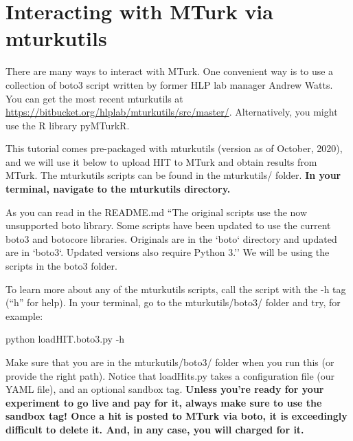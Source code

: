 \documentclass{article}
\newenvironment{code}%
   {\par\noindent\adjustbox{margin=1ex,bgcolor=shadecolor,margin=0ex \medskipamount}\bgroup\minipage\linewidth\verbatim}%
   {\endverbatim\endminipage\egroup}
\begin{document}
\section{Interacting with MTurk via mturkutils}

There are many ways to interact with MTurk. One convenient way is to use a collection of boto3 script written by former HLP lab manager Andrew Watts. You can get the most recent mturkutils at \url{https://bitbucket.org/hlplab/mturkutils/src/master/}. Alternatively, you might use the R library pyMTurkR. 

This tutorial comes pre-packaged with mturkutils (version as of October, 2020), and we will use it below to upload HIT to MTurk and obtain results from MTurk. The mturkutils scripts can be found in the mturkutils/ folder. \textbf{In your terminal, navigate to the mturkutils directory.} 

As you can read in the README.md ``The original scripts use the now unsupported boto library. Some scripts have been updated to use the current boto3 and botocore libraries. Originals are in the `boto` directory and updated are in `boto3`. Updated versions also require Python 3.'' We will be using the scripts in the boto3 folder. 



To learn more about any of the mturkutils scripts, call the script with the -h tag (``h'' for help). In your terminal, go to the mturkutils/boto3/ folder and try, for example:

\begin{code}
python loadHIT.boto3.py -h
\end{code}

Make sure that you are in the mturkutils/boto3/ folder when you run this (or provide the right path). Notice that loadHits.py takes a configuration file (our YAML file), and an optional sandbox tag. \textbf{Unless you're ready for your experiment to go live and pay for it, always make sure to use the sandbox tag! Once a hit is posted to MTurk via boto, it is exceedingly difficult to delete it. And, in any case, you will charged for it.}
\end{document}
